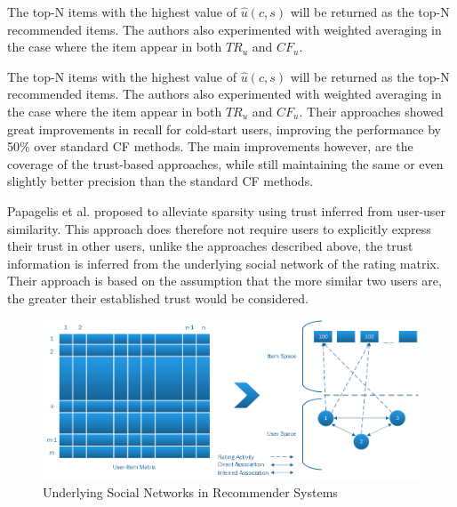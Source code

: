 The top-N items with the highest value of $\hat{u}(c,s)$ will be returned as
the top-N recommended items. The authors also experimented with weighted
averaging in the case where the item appear in both $TR_{u}$ and $CF_{u}$.

The top-N items with the highest value of $\hat{u}(c,s)$ will be returned as
the top-N recommended items. The authors also experimented with weighted
averaging in the case where the item appear in both $TR_{u}$ and $CF_{u}$.
Their approaches showed great improvements in recall for cold-start users,
improving the performance by 50\% over standard CF methods. The main
improvements however, are the coverage of the trust-based approaches, while
still maintaining the same or even slightly better precision than the standard
CF methods.





Papagelis et al. \cite{Papagelis2005} proposed to alleviate sparsity using
trust inferred from user-user similarity. This approach does therefore not
require users to explicitly express their trust in other users, unlike the
approaches described above, the trust information is inferred from the
underlying social network of the rating matrix. Their approach is based on the
assumption that the more similar two users are, the greater their established
trust would be considered.

\begin{figure}[H]
    \includegraphics[width=5in]{image/trustnetwork.png}
    \centering
    \caption[Underlying Social Networks in Recommender Systems]{Underlying Social Networks in Recommender Systems}
    \label{figure:cfsocialnetwork}
\end{figure}

